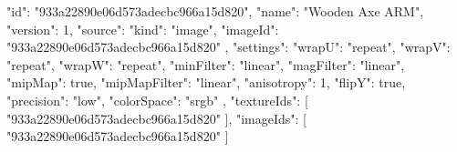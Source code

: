 {
  "id": "933a22890e06d573adecbc966a15d820",
  "name": "Wooden Axe ARM",
  "version": 1,
  "source": {
    "kind": "image",
    "imageId": "933a22890e06d573adecbc966a15d820"
  },
  "settings": {
    "wrapU": "repeat",
    "wrapV": "repeat",
    "wrapW": "repeat",
    "minFilter": "linear",
    "magFilter": "linear",
    "mipMap": true,
    "mipMapFilter": "linear",
    "anisotropy": 1,
    "flipY": true,
    "precision": "low",
    "colorSpace": "srgb"
  },
  "textureIds": [
    "933a22890e06d573adecbc966a15d820"
  ],
  "imageIds": [
    "933a22890e06d573adecbc966a15d820"
  ]
}
